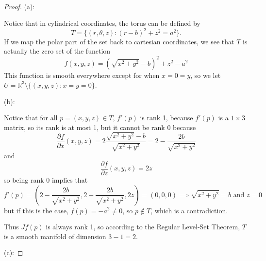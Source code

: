 \documentclass{article}
\theoremstyle{plain} %
\numberwithin{thm}{section} %
\theoremstyle{definition}
\begin{document}
        \begin{proof}
            (a):

        Notice that in cylindrical coordinates, the torus can be defined by
        \[
            T = \{ (r, \theta, z) : (r - b)^2 + z^2 = a^2\}.
        \]
        If we map the polar part of the set back to cartesian coordinates, we see that \(T\) is actually the zero set of the function
        \[
            f(x,y,z) = (\sqrt{x^2 + y^2} - b)^2 + z^2 - a^2
        \]
        This function is smooth everywhere except for when \(x = 0 = y\), so we let \(U = \mathbb{R}^3 \setminus \{ (x,y,z) : x = y = 0 \}\).

        \medskip

        (b):

        Notice that for all \(p = (x,y,z) \in T\), \(f'(p)\) is rank 1, because \(f'(p)\) is a \(1 \times 3\) matrix, so its rank is at most 1, but it cannot be rank 0 because
        \[
            \frac{\partial f}{\partial x} (x,y,z) = 2\frac{\sqrt{x^2 + y^2} - b}{\sqrt{x^2 + y^2}} = 2 - \frac{2b}{\sqrt{x^2 + y^2}}
        \]
        and
        \[
            \frac{\partial f}{\partial z} (x,y,z) = 2z
        \]
        so being rank 0 implies that
        \[
            f'(p) = \left( 2 - \frac{2b}{\sqrt{x^2 + y^2}}, 2 - \frac{2b}{\sqrt{x^2 + y^2}}, 2z \right) = (0,0,0) \implies \sqrt{x^2 + y^2} = b \text{ and } z = 0
        \]
        but if this is the case, \(f(p) = -a^2 \neq 0\), so \(p \notin T\), which is a contradiction.

        Thus \(Jf(p)\) is always rank 1, so according to the Regular Level-Set Theorem, \(T\) is a smooth manifold of dimension \(3 - 1 = 2\).

        \medskip

        (c):


\end{proof}
\end{document}
